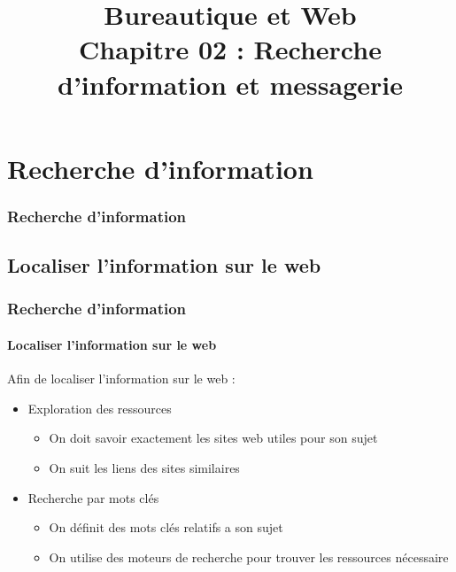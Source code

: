 \documentclass[xcolor=table]{beamer}
\title[BWEB : 02- RI et Gmail] %
{Bureautique et Web \\Chapitre 02 : Recherche d'information et messagerie}
\begin{document}
\section{Recherche d'information}

\begin{frame}
\frametitle{Recherche d'information}

\begin{center}
\end{center}

\end{frame}

\subsection{Localiser l'information sur le web}

\begin{frame}
\frametitle{Recherche d'information}
\framesubtitle{Localiser l'information sur le web}

Afin de localiser l'information sur le web : 
\begin{itemize}
	\item Exploration des ressources 
	\begin{itemize}
		\item On doit savoir exactement les sites web utiles pour son sujet 
		\item On suit les liens des sites similaires
	\end{itemize}
	\item Recherche par mots clés
	\begin{itemize}
		\item On définit des mots clés relatifs a son sujet  
		\item On utilise des moteurs de recherche pour trouver les ressources nécessaire
	\end{itemize}
\end{itemize} 

\end{frame}
\end{document}

